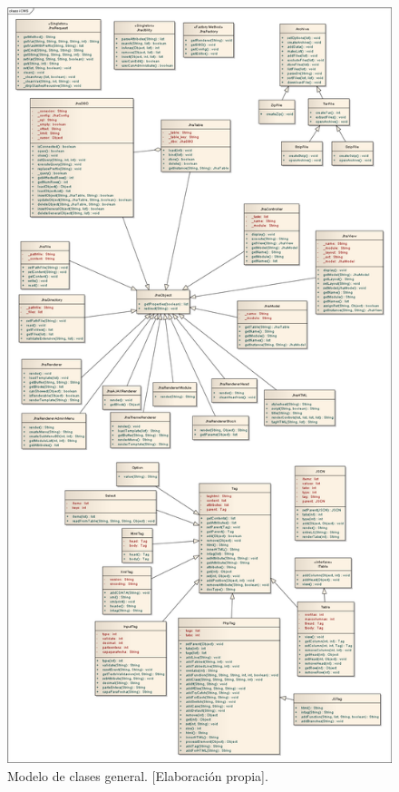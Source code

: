 \newpage
\begin{figure}[h]
\centering
\includegraphics[scale=.24, keepaspectratio=true]{imagenes/03_imagen.png}
\caption{Modelo de clases general. [Elaboraci\'on propia].}
\end{figure}
\clearpage
\newpage

